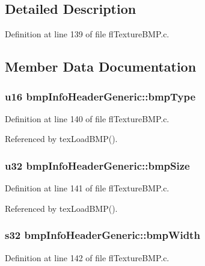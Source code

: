\subsection{Detailed Description}




Definition at line 139 of file fl\-Texture\-BMP.c.

\subsection{Member Data Documentation}
\subsubsection{\setlength{\rightskip}{0pt plus 5cm}u16 {\bf bmp\-Info\-Header\-Generic::bmp\-Type}}\label{structbmpInfoHeaderGeneric_1afa2db1609fbff5d212834b56f17bed}




Definition at line 140 of file fl\-Texture\-BMP.c.

Referenced by tex\-Load\-BMP().
\subsubsection{\setlength{\rightskip}{0pt plus 5cm}u32 {\bf bmp\-Info\-Header\-Generic::bmp\-Size}}\label{structbmpInfoHeaderGeneric_591f2f831bf48ae98fa83f25eee1177e}




Definition at line 141 of file fl\-Texture\-BMP.c.

Referenced by tex\-Load\-BMP().
\subsubsection{\setlength{\rightskip}{0pt plus 5cm}s32 {\bf bmp\-Info\-Header\-Generic::bmp\-Width}}\label{structbmpInfoHeaderGeneric_83569010b13c3a57d0cffa4d9a410bda}




Definition at line 142 of file fl\-Texture\-BMP.c.

